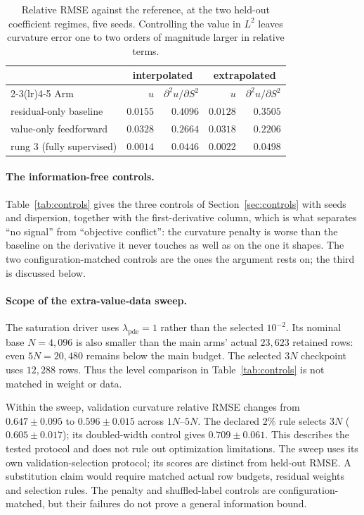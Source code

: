 \documentclass{article}
\begin{document}
\begin{table}[!htbp]
\caption{Relative RMSE against the reference, at the two held-out coefficient
regimes, five seeds. Controlling the value in $L^{2}$ leaves curvature error one to
two orders of magnitude larger in relative terms.}
\label{tab:motiv}
\centering\footnotesize\setlength{\tabcolsep}{6pt}
\begin{tabular}{@{}lrrrr@{}}
\toprule
& \multicolumn{2}{c}{interpolated} & \multicolumn{2}{c}{extrapolated} \\
\cmidrule(lr){2-3}\cmidrule(lr){4-5}
Arm & $u$ & $\partial^{2}u/\partial S^{2}$ & $u$ & $\partial^{2}u/\partial S^{2}$ \\
\midrule
residual-only baseline & $0.0155$ & $0.4096$ & $0.0128$ & $0.3505$ \\
value-only feedforward & $0.0328$ & $0.2664$ & $0.0318$ & $0.2206$ \\
rung 3 (fully supervised) & $0.0014$ & $0.0446$ & $0.0022$ & $0.0498$ \\
\bottomrule
\end{tabular}
\end{table}

\paragraph{The information-free controls.} Table~\ref{tab:controls} gives the three
controls of Section~\ref{sec:controls} with seeds and dispersion, together with the
first-derivative column, which is what separates ``no signal'' from ``objective
conflict'': the curvature penalty is worse than the baseline on the derivative it
never touches as well as on the one it shapes. The two configuration-matched
controls are the ones the argument rests on; the third is discussed below.

\paragraph{Scope of the extra-value-data sweep.} The saturation driver uses
$\lambda_{\mathrm{pde}}=1$ rather than the selected $10^{-2}$. Its nominal base
$N=4{,}096$ is also smaller than the main arms' actual $23{,}623$ retained rows:
even $5N=20{,}480$ remains below the main budget. The selected $3N$ checkpoint uses
$12{,}288$ rows. Thus the level comparison in Table~\ref{tab:controls} is not
matched in weight or data.

Within the sweep, validation curvature relative RMSE changes from
$0.647\pm0.095$ to $0.596\pm0.015$ across $1N$--$5N$. The declared $2\%$ rule
selects $3N$ ($0.605\pm0.017$); its doubled-width control gives
$0.709\pm0.061$. This describes the tested protocol and does not rule out
optimization limitations. The sweep uses its own validation-selection protocol;
its scores are distinct from held-out RMSE. A substitution claim would require
matched actual row budgets, residual weights and selection rules. The penalty and
shuffled-label controls are configuration-matched, but their failures do not prove
a general information bound.
\end{document}
